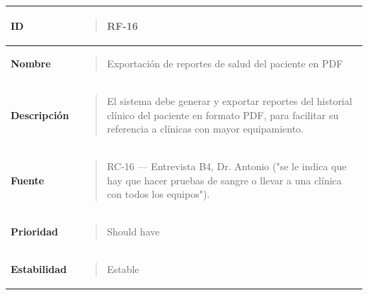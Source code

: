 \documentclass[
]{article}
\newcounter{none} %
\begin{document}
{\def\LTcaptype{none} %
\begin{longtable}[]{@{}
  >{\raggedright\arraybackslash}p{}
  >{\raggedright\arraybackslash}p{}@{}}
\toprule\noalign{}
\begin{minipage}[b]{\linewidth}\raggedright
\textbf{ID}
\end{minipage} & \begin{minipage}[b]{\linewidth}\raggedright
\begin{quote}
RF-16
\end{quote}
\end{minipage} \\
\midrule\noalign{}
\endhead
\bottomrule\noalign{}
\endlastfoot
\textbf{Nombre} & \begin{minipage}[t]{\linewidth}\raggedright
\begin{quote}
Exportación de reportes de salud del paciente en PDF
\end{quote}
\end{minipage} \\
\textbf{Descripción} & \begin{minipage}[t]{\linewidth}\raggedright
\begin{quote}
El sistema debe generar y exportar reportes del historial clínico del
paciente en formato PDF, para facilitar su referencia a clínicas con
mayor equipamiento.
\end{quote}
\end{minipage} \\
\textbf{Fuente} & \begin{minipage}[t]{\linewidth}\raggedright
\begin{quote}
RC-16 --- Entrevista B4, Dr. Antonio ("se le indica que hay que hacer
pruebas de sangre o llevar a una clínica con todos los equipos").
\end{quote}
\end{minipage} \\
\textbf{Prioridad} & \begin{minipage}[t]{\linewidth}\raggedright
\begin{quote}
Should have
\end{quote}
\end{minipage} \\
\textbf{Estabilidad} & \begin{minipage}[t]{\linewidth}\raggedright
\begin{quote}
Estable
\end{quote}

\end{minipage}
\end{longtable}}
\end{document}

